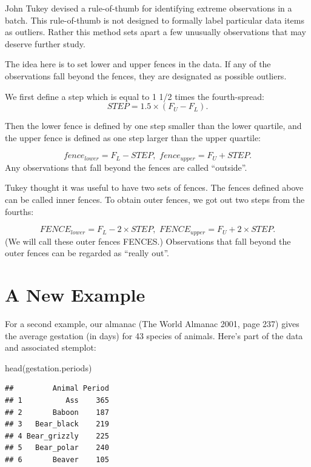 \documentclass[
]{book}
\newenvironment{Shaded}{\begin{snugshade}}{\end{snugshade}}
\newcommand{\FunctionTok}[1]{\textcolor[rgb]{0.00,0.00,0.00}{#1}}
\newcommand{\NormalTok}[1]{#1}
\begin{document}
John Tukey devised a rule-of-thumb for identifying extreme observations in a batch. This rule-of-thumb is not designed to formally label particular data items as outliers. Rather this method sets apart a few unusually observations that may deserve further study.

The idea here is to set lower and upper fences in the data. If any of the observations fall beyond the fences, they are designated as possible outliers.

We first define a step which is equal to 1 1/2 times the fourth-spread:
\[
          STEP = 1.5 \times (F_U - F_L).
\]

Then the lower fence is defined by one step smaller than the lower quartile, and the upper fence is defined as one step larger than the upper quartile:

\[
fence_{lower} = F_L - STEP, \, \, fence_{upper} = F_U + STEP.
\]
Any observations that fall beyond the fences are called ``outside''.

Tukey thought it was useful to have two sets of fences. The fences defined above can be called inner fences. To obtain outer fences, we got out two steps from the fourths:

\[
FENCE_{lower} = F_L - 2 \times STEP, \, \, FENCE_{upper} = F_U + 2 \times STEP.
\]
(We will call these outer fences FENCES.) Observations that fall beyond the outer fences can be regarded as ``really out''.

\hypertarget{a-new-example}{%
\section{A New Example}\label{a-new-example}}

For a second example, our almanac (The World Almanac 2001, page 237) gives the average gestation (in days) for 43 species of animals. Here's part of the data and associated stemplot:

\begin{Shaded}
\begin{Highlighting}[]
\FunctionTok{head}\NormalTok{(gestation.periods)}
\end{Highlighting}
\end{Shaded}

\begin{verbatim}
##         Animal Period
## 1          Ass    365
## 2       Baboon    187
## 3   Bear_black    219
## 4 Bear_grizzly    225
## 5   Bear_polar    240
## 6       Beaver    105
\end{verbatim}
\end{document}
